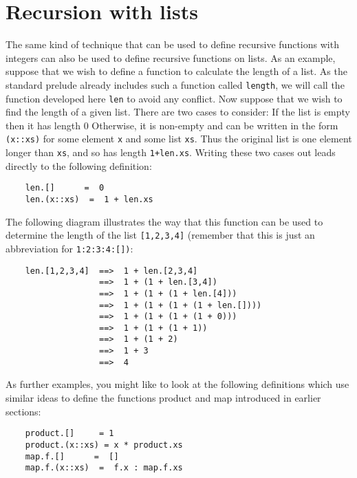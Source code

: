 \section{Recursion with lists}
The same kind of  technique  that  can  be  used  to  define  recursive
functions with integers can also be used to define recursive  functions
on lists.  As an example, suppose that we wish to define a function  to
calculate the length of  a  list.   As  the  standard  prelude  already
includes such a function called \verb"length", we  will  call  the  function
developed here \verb"len" to avoid any conflict.  Now suppose that  we  wish
to find the length of a given list.  There are two cases to consider:
\BSI
\IT  If the list is empty then it has length 0
\IT  Otherwise, it is non-empty and can be written in the  form  \verb"(x::xs)"
     for some element \verb"x" and some list \verb"xs".
     Thus the  original  list  is
     one element longer than \verb"xs", and so has length \verb"1+len.xs".
\ESI
Writing these two cases out leads directly to the following definition:
\begin{verbatim}
    len.[]      =  0
    len.(x::xs)  =  1 + len.xs
\end{verbatim}
The following diagram illustrates the way that  this  function  can  be
used to determine the length of the list \verb"[1,2,3,4]" (remember that  this
is just an abbreviation for \verb"1:2:3:4:[])":
\begin{verbatim}
    len.[1,2,3,4]  ==>  1 + len.[2,3,4]
                   ==>  1 + (1 + len.[3,4])
                   ==>  1 + (1 + (1 + len.[4]))
                   ==>  1 + (1 + (1 + (1 + len.[])))
                   ==>  1 + (1 + (1 + (1 + 0)))
                   ==>  1 + (1 + (1 + 1))
                   ==>  1 + (1 + 2)
                   ==>  1 + 3
                   ==>  4
\end{verbatim}
As  further  examples,  you  might  like  to  look  at  the   following
definitions which use similar ideas to define the functions product and
map introduced in earlier sections:
\begin{verbatim}
    product.[]     = 1
    product.(x::xs) = x * product.xs
    map.f.[]      =  []
    map.f.(x::xs)  =  f.x : map.f.xs
\end{verbatim}

